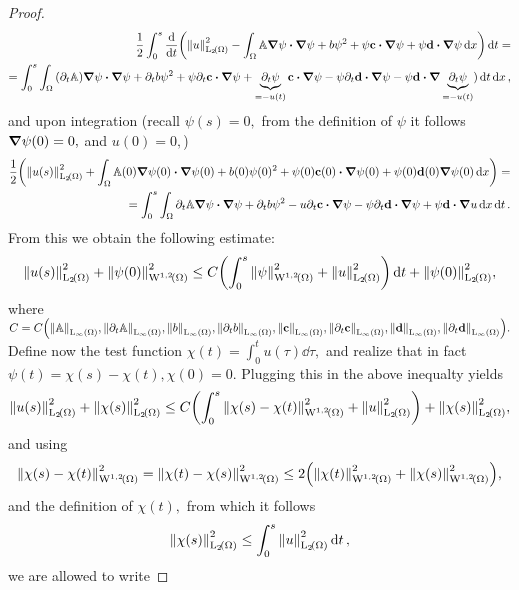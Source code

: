 \documentclass{article}
\begin{document}
\begin{proof}
	\begin{align*}
		\frac{1}{2}\int_0^s \dv{t}\qty (\norm{u}_{\LpSet[2]{\Omega}}^{2} - \int_{\Omega}\tensorq{A}\grad \psi \vdot \grad \psi + b \psi^{2} + \psi \vb{c} \vdot \grad \psi + \psi \vb{d} \vdot \grad \psi \dd{x})\dd{t} = \\
		=\int_0^s \int_{\Omega}\qty(\partial_t \tensorq{A}) \grad \psi \vdot \grad \psi + \partial_t b \psi^{2} + \psi \partial_t \vb{c} \vdot \grad \psi + \underbrace{\partial_t \psi}_{=-u(t)} \vb{c} \vdot \grad \psi - \psi \partial_t \vb{d} \vdot \grad \psi - \psi \vb{d} \vdot \grad \underbrace{\partial_t \psi}_{=- u(t)})\dd{t}\dd{x},
	\end{align*}
	and upon integration (recall $\psi(s) =0,$ from the definition of $\psi$ it follows $\grad \psi(0) = 0,$ and $u(0) =0,$)
	\begin{align*}
		\frac{1}{2}\qty(\norm{u(s)}_{\LpSet[2]{\Omega}}^{2} + \int_{\Omega}\tensorq{A}(0) \grad \psi(0) \vdot \grad\psi(0) + b(0) \psi(0)^{2} + \psi(0) \vb{c}(0) \vdot \grad \psi(0) + \psi(0) \vb{d}(0) \grad \psi(0) \dd{x}) = \\
		= \int_0^s \int_{\Omega}\partial_t \tensorq{A} \grad \psi \vdot \grad\psi + \partial_t b \psi^{2} - u \partial_t \vb{c} \vdot \grad \psi - \psi \partial_t \vb{d} \vdot \grad \psi + \psi \vb{d} \vdot \grad u\dd{x}\dd{t}.
	\end{align*}
	From this we obtain the following estimate:
	\[
		\norm{u(s)}_{\LpSet[2]{\Omega}}^{2} + \norm{\psi(0)}_{\WkpSet[1][2]{\Omega}}^{2} \leq C\qty(\int_0^s \norm{\psi}_{\WkpSet[1][2]{\Omega}}^{2} + \norm{u}_{\LpSet[2]{\Omega}}^{2})\dd{t} + \norm{\psi(0)}_{\LpSet[2]{\Omega}}^{2},
	\]
	where $C = C\qty(\norm{\tensorq{A}}_{\LinfSet{\Omega}}, \norm{\partial_t \tensorq{A}}_{\LinfSet{\Omega}}, \norm{b}_{\LinfSet{\Omega}}, \norm{\partial_t b}_{\LinfSet{\Omega}}, \norm{\vb{c}}_{\LinfSet{\Omega}}, \norm{\partial_t\vb{c}}_{\LinfSet{\Omega}}, \norm{\vb{d}}_{\LinfSet{\Omega}}, \norm{\partial_t\vb{d}}_{\LinfSet{\Omega}}).$ Define now the test function $\chi(t) = \int_0^t u(\tau)\dd{\tau},$ and realize that in fact $\psi(t) = \chi(s) - \chi(t), \chi(0) = 0.$ Plugging this in the above inequalty yields
	\[
		\norm{u(s)}_{\LpSet[2]{\Omega}}^{2} + \norm{\chi(s)}_{\LpSet[2]{\Omega}}^{2} \leq C\qty(\int_0^s \norm{\chi(s)-\chi(t)}_{\WkpSet[1][2]{\Omega}}^{2} + \norm{u}_{\LpSet[2]{\Omega}}^{2})+ \norm{\chi(s)}_{\LpSet[2]{\Omega}}^{2},
	\]
	and using
	\[
		\norm{\chi(s)-\chi(t)}_{\WkpSet[1][2]{\Omega}}^{2} = \norm{\chi(t)- \chi(s)}_{\WkpSet[1][2]{\Omega}}^{2} \leq 2\qty(\norm{\chi(t)}_{\WkpSet[1][2]{\Omega}}^{2} + \norm{\chi(s)}_{\WkpSet[1][2]{\Omega}}^{2}),
	\]
	and the definition of $\chi(t),$ from which it follows
	\[
		\norm{\chi(s)}_{\LpSet[2]{\Omega}}^{2} \leq \int_0^s \norm{u}_{\LpSet[2]{\Omega}}^{2}\dd{t},
	\]
	we are allowed to write


\end{proof}
\end{document}
